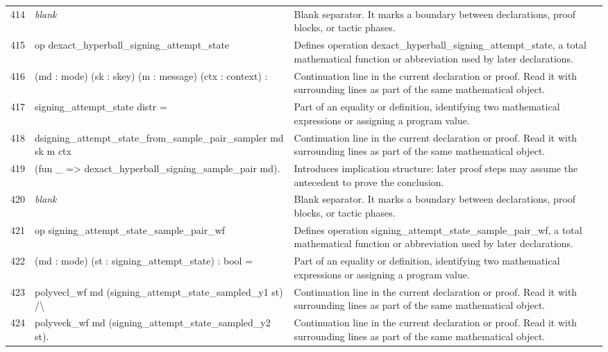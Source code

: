 \documentclass[10pt]{article}
\begin{document}
\begin{longtable}{r L{0.53\textwidth} L{0.37\textwidth}}
414 & {\ttfamily\scriptsize \emph{blank}} & Blank separator.  It marks a boundary between declarations, proof blocks, or tactic phases. \\
415 & {\ttfamily\scriptsize op dexact\_hyperball\_signing\_attempt\_state} & Defines operation dexact\_hyperball\_signing\_attempt\_state, a total mathematical function or abbreviation used by later declarations. \\
416 & {\ttfamily\scriptsize    (md : mode) (sk : skey) (m : message) (ctx : context) :} & Continuation line in the current declaration or proof.  Read it with surrounding lines as part of the same mathematical object. \\
417 & {\ttfamily\scriptsize    signing\_attempt\_state distr =} & Part of an equality or definition, identifying two mathematical expressions or assigning a program value. \\
418 & {\ttfamily\scriptsize   dsigning\_attempt\_state\_from\_sample\_pair\_sampler md sk m ctx} & Continuation line in the current declaration or proof.  Read it with surrounding lines as part of the same mathematical object. \\
419 & {\ttfamily\scriptsize     (fun \_ => dexact\_hyperball\_signing\_sample\_pair md).} & Introduces implication structure: later proof steps may assume the antecedent to prove the conclusion. \\
420 & {\ttfamily\scriptsize \emph{blank}} & Blank separator.  It marks a boundary between declarations, proof blocks, or tactic phases. \\
421 & {\ttfamily\scriptsize op signing\_attempt\_state\_sample\_pair\_wf} & Defines operation signing\_attempt\_state\_sample\_pair\_wf, a total mathematical function or abbreviation used by later declarations. \\
422 & {\ttfamily\scriptsize    (md : mode) (st : signing\_attempt\_state) : bool =} & Part of an equality or definition, identifying two mathematical expressions or assigning a program value. \\
423 & {\ttfamily\scriptsize   polyvecl\_wf md (signing\_attempt\_state\_sampled\_y1 st) /\textbackslash{}} & Continuation line in the current declaration or proof.  Read it with surrounding lines as part of the same mathematical object. \\
424 & {\ttfamily\scriptsize   polyveck\_wf md (signing\_attempt\_state\_sampled\_y2 st).} & Continuation line in the current declaration or proof.  Read it with surrounding lines as part of the same mathematical object. \\

\end{longtable}
\end{document}

